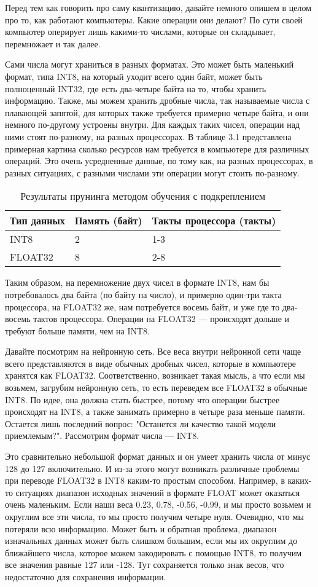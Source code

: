 \documentclass[oneside,final,12pt]{extreport}
\begin{document}
Перед тем как говорить про саму квантизацию,  давайте немного опишем в целом про то, как работают компьютеры. Какие операции они делают? По сути своей компьютер оперирует лишь какими-то числами, которые он складывает, перемножает и так далее.

Сами числа могут храниться в разных форматах. Это может быть маленький формат, типа INT8, на который уходит всего один байт, может быть полноценный INT32, где есть два-четыре байта на то, чтобы хранить информацию. Также, мы можем хранить дробные числа, так называемые числа с плавающей запятой, для которых также требуется примерно четыре байта, и они немного по-другому устроены внутри. Для каждых таких чисел, операции над ними стоят по-разному, на разных процессорах. В таблице 3.1 представлена примерная картина сколько ресурсов нам требуется в компьютере для различных операций. Это очень усредненные данные, по тому как, на разных процессорах, в разных ситуациях, с разными числами эти операции могут стоить по-разному.
\begin{table}[H]
\caption{Результаты прунинга методом обучения с подкреплением}
\label{table_1}
\begin{tabularx}{\textwidth}{|X|X|X|} %
\hline
Тип данных & Память (байт) & Такты процессора (такты) \\ \hline
INT8 & 2 & 1-3 \\ 
FLOAT32 & 8 & 2-8 \\ \hline
\end{tabularx}
\end{table}
Таким образом, на перемножение двух чисел в формате INT8, нам бы потребовалось два байта (по байту на число), и примерно один-три такта процессора, на FLOAT32 же, нам потребуется восемь байт, и уже где то два-восемь тактов процессора. Операции на FLOAT32 — происходят дольше и требуют больше памяти, чем на INT8. 

Давайте посмотрим на нейронную сеть. Все веса внутри нейронной сети чаще всего представляются в виде обычных дробных чисел, которые в компьютере хранятся как FLOAT32. Соответственно, возникает такая мысль, а что если мы возьмем, загрубим нейронную сеть, то есть переведем все FLOAT32 в обычные INT8. 
По идее, она должна стать быстрее, потому что операции быстрее происходят на INT8, а также занимать примерно в четыре раза меньше памяти. Остается лишь последний вопрос: "Останется ли качество такой модели приемлемым?". Рассмотрим формат числа — INT8.

Это сравнительно небольшой формат данных и он умеет хранить числа от минус 128 до 127 включительно. И из-за этого могут возникать различные проблемы при переводе FLOAT32 в INT8 каким-то простым способом. Например, в каких-то ситуациях диапазон исходных значений в формате FLOAT может оказаться очень маленьким. Если наши веса 0.23, 0.78, -0.56, -0.99, и мы просто возьмем и округлим все эти числа, то мы просто получим четыре нуля. Очевидно, что мы потеряли всю информацию. Может быть и обратная проблема, диапазон изначальных данных может быть слишком большим, если мы их округлим до ближайшего числа, которое можем закодировать с помощью INT8, то получим все значения равные 127 или -128. Тут сохраняется только знак весов, что недостаточно для сохранения информации.
\end{document}
